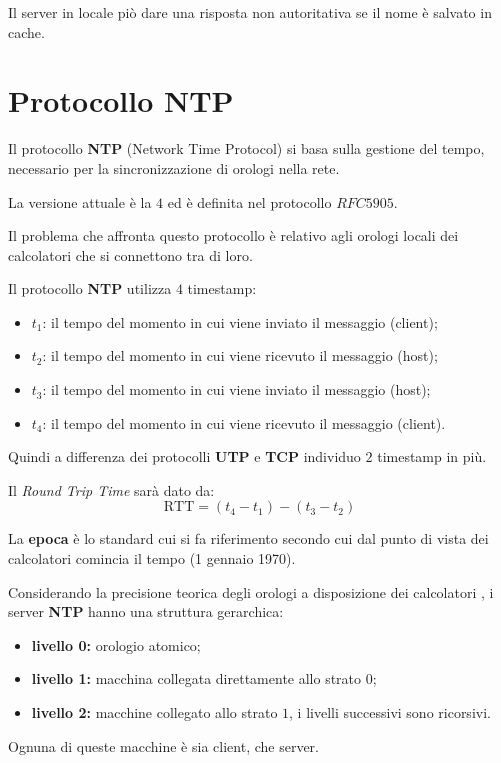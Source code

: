 Il server in locale piò dare una risposta non autoritativa se il nome è
salvato in cache.

\section{Protocollo NTP}
Il protocollo \textbf{NTP} (Network Time Protocol) si basa sulla gestione del
tempo, necessario per la sincronizzazione di orologi nella rete.

La versione attuale è la $4$ ed è definita nel protocollo $RFC5905$.


Il problema che affronta questo protocollo è relativo agli orologi locali dei
calcolatori che si connettono tra di loro.


Il protocollo \textbf{NTP} utilizza $4$ timestamp:
\begin{itemize}
  \item $t_1$: il tempo del momento in cui viene inviato il messaggio
    (client);
  \item $t_2$: il tempo del momento in cui viene ricevuto il messaggio
    (host);
  \item $t_3$: il tempo del momento in cui viene inviato il messaggio
    (host);
  \item $t_4$: il tempo del momento in cui viene ricevuto il messaggio
    (client).
\end{itemize}

Quindi a differenza dei protocolli \textbf{UTP} e \textbf{TCP} individuo $2$
timestamp in più.

Il \emph{Round Trip Time} sarà dato da:
\[
  \text{RTT}=(t_4-t_1)-(t_3-t_2)
\]


La \textbf{epoca} è lo standard cui si fa riferimento secondo cui dal punto
di vista dei calcolatori comincia il tempo (1 gennaio 1970).

Considerando la precisione teorica degli orologi a disposizione dei calcolatori
, i server \textbf{NTP} hanno una struttura gerarchica:
\begin{itemize}
  \item \textbf{livello 0:} orologio atomico;
  \item \textbf{livello 1:} macchina collegata direttamente allo strato $0$;
  \item \textbf{livello 2:} macchine collegato allo strato $1$, i livelli
    successivi sono ricorsivi.
\end{itemize}
Ognuna di queste macchine è sia client, che server.
